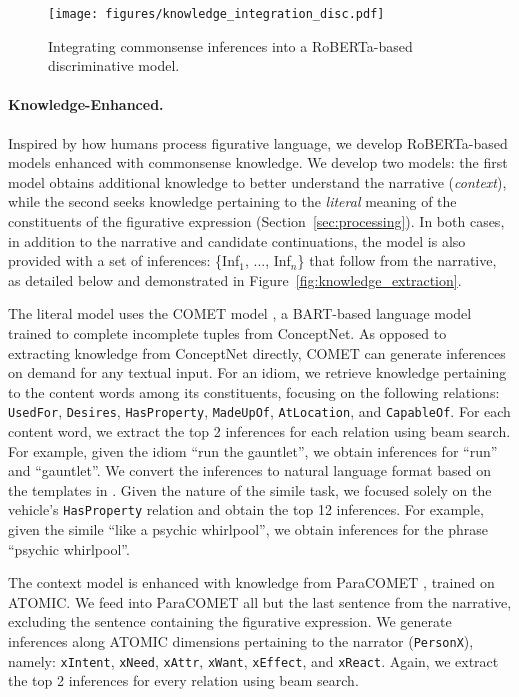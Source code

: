 \begin{figure*}[t]
    \centering
    \texttt{[image: figures/knowledge\_integration\_disc.pdf]}
    \vspace{-4ex}
    \caption{Integrating commonsense inferences into a RoBERTa-based discriminative model.}
    \label{fig:architecture_discriminative}
\end{figure*}


\paragraph{Knowledge-Enhanced.} Inspired by how humans process figurative language, we develop RoBERTa-based models enhanced with commonsense knowledge. We develop two models: the first model obtains additional knowledge to better understand the narrative (\emph{context}), while the second seeks knowledge pertaining to the \emph{literal} meaning of the constituents of the figurative expression (Section~\ref{sec:processing}). In both cases, in addition to the narrative and candidate continuations, the model is also provided with a set of inferences: \{Inf$_1$, ..., Inf$_n$\} that follow from the narrative, as detailed below and demonstrated in Figure~\ref{fig:knowledge_extraction}.

The literal model uses the COMET model \cite{Hwang2021COMETATOMIC2O}, a BART-based language model trained to complete incomplete tuples from ConceptNet. As opposed to extracting knowledge from ConceptNet directly, COMET can generate inferences on demand for any textual input. For an idiom, we retrieve knowledge pertaining to the content words among its constituents, focusing on the following relations: \texttt{UsedFor}, \texttt{Desires}, \texttt{HasProperty}, \texttt{MadeUpOf}, \texttt{AtLocation}, and \texttt{CapableOf}. For each content word, we extract the top 2 inferences for each relation using beam search. For example, given the idiom ``run the gauntlet'', we obtain inferences for ``run'' and ``gauntlet''. We convert the inferences to natural language format based on the templates in \citet{guan2019story}. Given the nature of the simile task, we focused solely on the vehicle's \texttt{HasProperty} relation and obtain the top 12 inferences. For example, given the simile ``like a psychic whirlpool'', we obtain inferences for the phrase ``psychic whirlpool''.

The context model is enhanced with knowledge from ParaCOMET \cite{Gabriel2021ParagraphLevelCT}, trained on ATOMIC. We feed into ParaCOMET all but the last sentence from the narrative, excluding the sentence containing the figurative expression. We generate inferences along ATOMIC dimensions pertaining to the narrator (\texttt{PersonX}), namely: \texttt{xIntent}, \texttt{xNeed}, \texttt{xAttr}, \texttt{xWant}, \texttt{xEffect}, and  \texttt{xReact}. Again, we extract the top 2 inferences for every relation using beam search.

